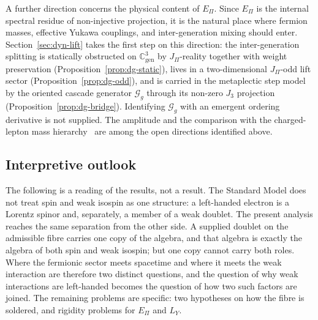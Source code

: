 \documentclass[11pt,a4paper]{article}
\theoremstyle{definition}
\theoremstyle{remark}
\begin{document}
  A further direction concerns the physical content of $E_\Pi$.
  Since $E_\Pi$ is the internal spectral residue of non-injective projection, it is
  the natural place where fermion masses, effective Yukawa couplings, and
  inter-generation mixing should enter.
  Section~\ref{sec:dyn-lift} takes the first step on this direction: the
  inter-generation splitting is statically obstructed on $\mathbb{C}^3_{\mathrm{gen}}$ by
  $J_\Pi$-reality together with weight preservation (Proposition~\ref{prop:dg-static}), lives in a
  two-dimensional $J_\Pi$-odd lift sector (Proposition~\ref{prop:dg-odd}), and is carried in the
  metaplectic step model by the oriented cascade generator $\mathcal{G}_g$ through its non-zero $J_3$
  projection (Proposition~\ref{prop:dg-bridge}).
  Identifying $\mathcal{G}_g$ with an emergent ordering derivative is not supplied.
  The amplitude and the comparison with the charged-lepton mass hierarchy~\cite{Beau2026a4,Beau2026a29}
  are among the open directions identified above.

  \subsection*{Interpretive outlook}

  The following is a reading of the results, not a result.
  The Standard Model does not treat spin and weak isospin as one structure: a left-handed electron is a
  Lorentz spinor and, separately, a member of a weak doublet.
  The present analysis reaches the same separation from the other side.
  A supplied doublet on the admissible fibre carries one copy of the algebra, and that algebra is exactly the
  algebra of both spin and weak isospin; but one copy cannot carry both roles.
  Where the fermionic sector meets spacetime and where it meets the weak interaction are therefore two
  distinct questions, and the question of why weak interactions are left-handed becomes the question of
  how two such factors are joined.
  The remaining problems are specific: two hypotheses on how the fibre is soldered, and rigidity problems
  for $E_\Pi$ and $L_Y$.
\end{document}

